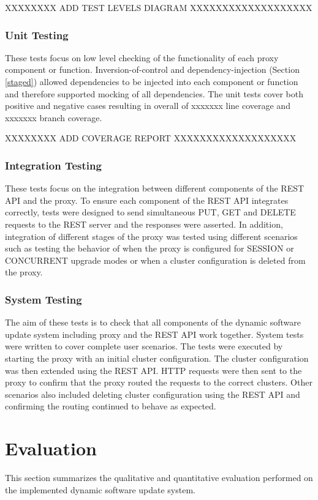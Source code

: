 \documentclass[a4paper,11pt,twoside]{report}
\begin{document}
XXXXXXXX ADD TEST LEVELS DIAGRAM  XXXXXXXXXXXXXXXXXXX\bigskip

\subsection{Unit Testing}
These tests focus on low level checking of the functionality of each proxy component or function. Inversion-of-control and dependency-injection (Section \ref{staged}) allowed dependencies to be injected into each component or function and therefore supported mocking of all dependencies. The unit tests cover both positive and negative cases resulting in overall of xxxxxxx line coverage and xxxxxxx branch coverage.\bigskip    

XXXXXXXX ADD COVERAGE REPORT XXXXXXXXXXXXXXXXXXX\bigskip

\subsection{Integration Testing}
These tests focus on the integration between different components of the REST API and the proxy. To ensure each component of the REST API integrates correctly, tests were designed to send simultaneous PUT, GET and DELETE requests to the REST server and the responses were asserted. In addition, integration of different stages of the proxy was tested using different scenarios such as testing the behavior of when the proxy is configured for SESSION or CONCURRENT upgrade modes or when a cluster configuration is deleted from the proxy.

\subsection{System Testing}
The aim of these tests is to check that all components of the dynamic software update system including proxy and the REST API work together. System tests were written to cover complete user scenarios. The tests were executed by starting the proxy with an initial cluster configuration. The cluster configuration was then extended using the REST API.  HTTP requests were then sent to the proxy to confirm that the proxy routed the requests to the correct clusters.  Other scenarios also included deleting cluster configuration using the REST API and confirming the routing continued to behave as expected.

\clearpage

\chapter{Evaluation}
This section summarizes the qualitative and quantitative evaluation performed on the implemented dynamic software update system.
\end{document}
